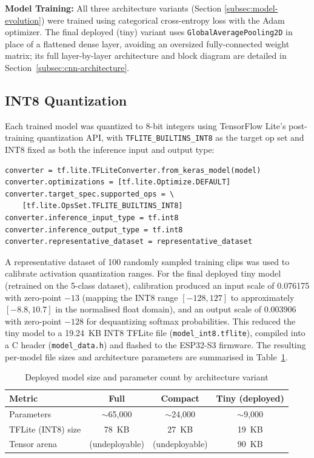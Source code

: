 \textbf{Model Training:} All three architecture variants (Section
\ref{subsec:model-evolution}) were trained using categorical cross-entropy
loss with the Adam optimizer. The final deployed (tiny) variant uses
\texttt{GlobalAveragePooling2D} in place of a flattened dense layer, avoiding
an oversized fully-connected weight matrix; its full layer-by-layer
architecture and block diagram are detailed in
Section~\ref{subsec:cnn-architecture}.

\subsection{INT8 Quantization}
\label{subsec:quantization-impl}

Each trained model was quantized to 8-bit integers using TensorFlow Lite's
post-training quantization API, with \texttt{TFLITE\_BUILTINS\_INT8} as the
target op set and INT8 fixed as both the inference input and output type:

\begin{verbatim}
converter = tf.lite.TFLiteConverter.from_keras_model(model)
converter.optimizations = [tf.lite.Optimize.DEFAULT]
converter.target_spec.supported_ops = \
    [tf.lite.OpsSet.TFLITE_BUILTINS_INT8]
converter.inference_input_type = tf.int8
converter.inference_output_type = tf.int8
converter.representative_dataset = representative_dataset
\end{verbatim}

A representative dataset of 100 randomly sampled training clips was used to
calibrate activation quantization ranges. For the final deployed tiny model
(retrained on the 5-class dataset), calibration produced an input scale of
0.076175 with zero-point $-13$ (mapping the INT8 range $[-128, 127]$ to
approximately $[-8.8, 10.7]$ in the normalised float domain), and an output
scale of 0.003906 with zero-point $-128$ for dequantizing softmax
probabilities. This reduced the tiny model to a 19.24~KB INT8 TFLite file
(\texttt{model\_int8.tflite}), compiled into a C header
(\texttt{model\_data.h}) and flashed to the ESP32-S3 firmware. The resulting
per-model file sizes and architecture parameters are summarised in
Table~\ref{tab:model-evolution-impl}.

\begin{table}[H]
    \centering
    \caption{Deployed model size and parameter count by architecture variant}
    \label{tab:model-evolution-impl}
    \begin{tabular}{lccc}
        \toprule
        \textbf{Metric} & \textbf{Full} & \textbf{Compact} & \textbf{Tiny (deployed)} \\
        \midrule
        Parameters          & $\sim$65{,}000 & $\sim$24{,}000 & $\sim$9{,}000 \\
        TFLite (INT8) size  & 78~KB          & 27~KB          & 19~KB \\
        Tensor arena        & (undeployable) & (undeployable) & 90~KB \\
        \bottomrule
    \end{tabular}
\end{table}



